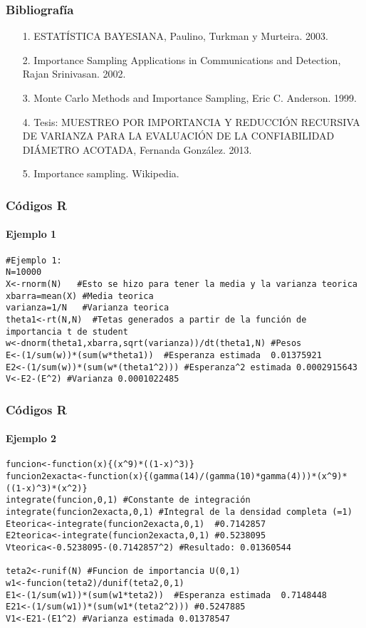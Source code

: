 \documentclass[12pt]{beamer}
\begin{document}
\begin{frame}
\frametitle{Bibliografía}
\begin{itemize}
\item[1.]ESTATÍSTICA BAYESIANA, Paulino, Turkman y Murteira. 2003.
\item[2.]Importance Sampling Applications in Communications and Detection, Rajan Srinivasan. 2002.
\item[3.]Monte Carlo Methods and Importance Sampling, Eric C. Anderson. 1999.
\item[4.]Tesis: MUESTREO POR IMPORTANCIA Y REDUCCIÓN RECURSIVA DE VARIANZA PARA LA EVALUACIÓN DE LA CONFIABILIDAD DIÁMETRO ACOTADA, Fernanda González. 2013.
\item[5.]Importance sampling. Wikipedia.
\end{itemize}
\end{frame}

\begin{frame}[fragile]
\frametitle{Códigos R}
\framesubtitle{Ejemplo 1}
\begin{verbatim}
#Ejemplo 1:
N=10000
X<-rnorm(N)   #Esto se hizo para tener la media y la varianza teorica
xbarra=mean(X) #Media teorica
varianza=1/N   #Varianza teorica
theta1<-rt(N,N)  #Tetas generados a partir de la función de importancia t de student
w<-dnorm(theta1,xbarra,sqrt(varianza))/dt(theta1,N) #Pesos
E<-(1/sum(w))*(sum(w*theta1))  #Esperanza estimada  0.01375921
E2<-(1/sum(w))*(sum(w*(theta1^2))) #Esperanza^2 estimada 0.0002915643
V<-E2-(E^2) #Varianza 0.0001022485
\end{verbatim}
\end{frame}

\begin{frame}[fragile]
\frametitle{Códigos R}
\framesubtitle{Ejemplo 2}
\begin{verbatim}
funcion<-function(x){(x^9)*((1-x)^3)}
funcion2exacta<-function(x){(gamma(14)/(gamma(10)*gamma(4)))*(x^9)*((1-x)^3)*(x^2)} 
integrate(funcion,0,1) #Constante de integración
integrate(funcion2exacta,0,1) #Integral de la densidad completa (=1)
Eteorica<-integrate(funcion2exacta,0,1)  #0.7142857
E2teorica<-integrate(funcion2exacta,0,1) #0.5238095
Vteorica<-0.5238095-(0.7142857^2) #Resultado: 0.01360544

teta2<-runif(N) #Funcion de importancia U(0,1)
w1<-funcion(teta2)/dunif(teta2,0,1)
E1<-(1/sum(w1))*(sum(w1*teta2))  #Esperanza estimada  0.7148448
E21<-(1/sum(w1))*(sum(w1*(teta2^2))) #0.5247885
V1<-E21-(E1^2) #Varianza estimada 0.01378547
\end{verbatim}
\end{frame}
\end{document}
